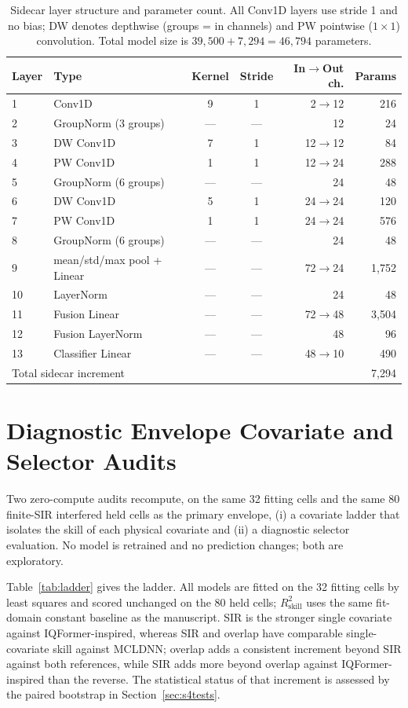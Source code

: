 \documentclass[letterpaper,onecolumn,11pt,journal]{IEEEtran}
\begin{document}
\begin{table}[t]
\centering
\caption{Sidecar layer structure and parameter count. All Conv1D layers use
stride 1 and no bias; DW denotes depthwise (groups = in channels) and PW
pointwise ($1\times1$) convolution. Total model size is $39{,}500+7{,}294=
46{,}794$ parameters.}
\label{tab:sidecar}
\footnotesize
\setlength{\tabcolsep}{4pt}
\begin{tabular}{llccrr}
\toprule
Layer & Type & Kernel & Stride & In$\to$Out ch. & Params\\
\midrule
1 & Conv1D & 9 & 1 & 2$\to$12 & 216\\
2 & GroupNorm (3 groups) & --- & --- & 12 & 24\\
3 & DW Conv1D & 7 & 1 & 12$\to$12 & 84\\
4 & PW Conv1D & 1 & 1 & 12$\to$24 & 288\\
5 & GroupNorm (6 groups) & --- & --- & 24 & 48\\
6 & DW Conv1D & 5 & 1 & 24$\to$24 & 120\\
7 & PW Conv1D & 1 & 1 & 24$\to$24 & 576\\
8 & GroupNorm (6 groups) & --- & --- & 24 & 48\\
9 & mean/std/max pool + Linear & --- & --- & 72$\to$24 & 1{,}752\\
10 & LayerNorm & --- & --- & 24 & 48\\
11 & Fusion Linear & --- & --- & 72$\to$48 & 3{,}504\\
12 & Fusion LayerNorm & --- & --- & 48 & 96\\
13 & Classifier Linear & --- & --- & 48$\to$10 & 490\\
\midrule
\multicolumn{5}{l}{Total sidecar increment} & 7{,}294\\
\bottomrule
\end{tabular}
\end{table}

\section{Diagnostic Envelope Covariate and Selector Audits}
Two zero-compute audits recompute, on the same 32 fitting cells and the same
80 finite-SIR interfered held cells as the primary envelope, (i) a covariate
ladder that isolates the skill of each physical covariate and (ii) a
diagnostic selector evaluation. No model is retrained and no prediction
changes; both are exploratory.

Table~\ref{tab:ladder} gives the ladder. All models are fitted on the 32
fitting cells by least squares and scored unchanged on the 80 held cells;
$R^2_{\mathrm{skill}}$ uses the same fit-domain constant baseline as the
manuscript. SIR is the stronger single covariate against IQFormer-inspired,
whereas SIR and overlap have comparable single-covariate skill against
MCLDNN; overlap adds a consistent increment beyond SIR against both
references, while SIR adds more beyond overlap against IQFormer-inspired
than the reverse. The statistical status of that increment is assessed by the
paired bootstrap in Section~\ref{sec:s4tests}.
\end{document}
